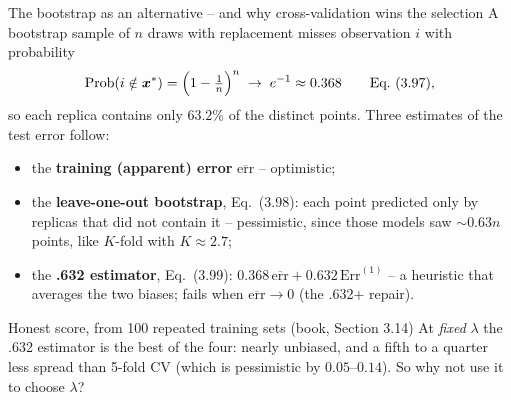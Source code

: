 \documentclass[10pt,aspectratio=169]{beamer}
\begin{document}
\begin{frame}{The bootstrap as an alternative -- and why cross-validation wins the selection}
A bootstrap sample of $n$ draws with replacement misses observation $i$ with
probability
\[
  \mathrm{Prob}(i\notin\bm{x}^*)=\Bigl(1-\tfrac1n\Bigr)^n\;\to\;e^{-1}\approx0.368
  \qquad\text{Eq.~(3.97)},
\]
so each replica contains only $63.2\%$ of the distinct points.  Three
estimates of the test error follow:
\begin{itemize}
  \item the \textbf{training (apparent) error} $\overline{\mathrm{err}}$ --
        optimistic;
  \item the \textbf{leave-one-out bootstrap}, Eq.~(3.98): each point predicted
        only by replicas that did not contain it -- pessimistic, since those
        models saw $\sim0.63n$ points, like $K$-fold with $K\approx2.7$;
  \item the \textbf{.632 estimator}, Eq.~(3.99):
        $0.368\,\overline{\mathrm{err}}+0.632\,\mathrm{Err}^{(1)}$ -- a
        heuristic that averages the two biases; fails when
        $\overline{\mathrm{err}}\to0$ (the .632+ repair).
\end{itemize}
\vspace{2pt}
\begin{block}{Honest score, from 100 repeated training sets (book, Section 3.14)}
At \emph{fixed} $\lambda$ the .632 estimator is the best of the four: nearly
unbiased, and a fifth to a quarter less spread than 5-fold CV (which is
pessimistic by $0.05$--$0.14$).  So why not use it to choose $\lambda$?
\end{block}
\end{frame}
\end{document}
